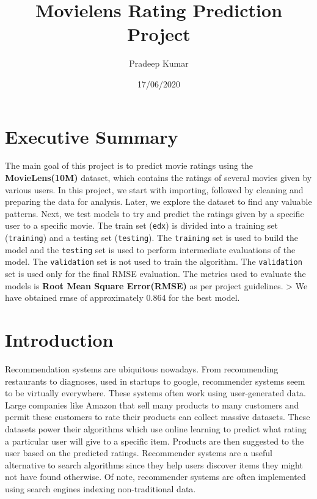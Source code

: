 \documentclass[
]{article}
\title{Movielens Rating Prediction Project}
\author{Pradeep Kumar}
\date{17/06/2020}
\begin{document}
\maketitle

{
\setcounter{tocdepth}{2}
\tableofcontents
}
\hypertarget{executive-summary}{%
\section{Executive Summary}\label{executive-summary}}

The main goal of this project is to predict movie ratings using the
\textbf{MovieLens(10M)} dataset, which contains the ratings of several
movies given by various users. In this project, we start with importing,
followed by cleaning and preparing the data for analysis. Later, we
explore the dataset to find any valuable patterns. Next, we test models
to try and predict the ratings given by a specific user to a specific
movie. The train set (\texttt{edx}) is divided into a training set
(\texttt{training}) and a testing set (\texttt{testing}). The
\texttt{training} set is used to build the model and the
\texttt{testing} set is used to perform intermediate evaluations of the
model. The \texttt{validation} set is not used to train the algorithm.
The \texttt{validation} set is used only for the final RMSE evaluation.
The metrics used to evaluate the models is \textbf{Root Mean Square
Error(RMSE)} as per project guidelines. \textgreater{} We have obtained
rmse of approximately 0.864 for the best model.

\pagebreak

\hypertarget{introduction}{%
\section{Introduction}\label{introduction}}

Recommendation systems are ubiquitous nowadays. From recommending
restaurants to diagnoses, used in startups to google, recommender
systems seem to be virtually everywhere. These systems often work using
user-generated data. Large companies like Amazon that sell many products
to many customers and permit these customers to rate their products can
collect massive datasets. These datasets power their algorithms which
use online learning to predict what rating a particular user will give
to a specific item. Products are then suggested to the user based on the
predicted ratings. Recommender systems are a useful alternative to
search algorithms since they help users discover items they might not
have found otherwise. Of note, recommender systems are often implemented
using search engines indexing non-traditional data.
\end{document}
